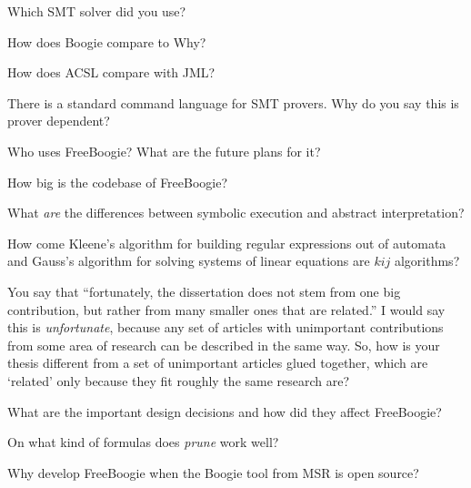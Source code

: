 \Q Which SMT solver did you use?

\Q How does Boogie compare to Why?

\Q How does ACSL compare with JML?

\Q There is a standard command language for SMT provers. Why do you say
this is prover dependent?

\Q Who uses FreeBoogie? What are the future plans for it?

\Q How big is the codebase of FreeBoogie?

\Q What {\it are\/} the differences between symbolic execution and abstract
interpretation?

\Q How come Kleene's algorithm for building regular expressions out of
automata and Gauss's algorithm for solving systems of linear equations are
$kij$ algorithms?

\Q You say that ``fortunately, the dissertation does not stem from one big
contribution, but rather from many smaller ones that are related.'' I would
say this is {\it unfortunate}, because any set of articles with unimportant
contributions from some area of research can be described in the same way.
So, how is your thesis different from a set of unimportant articles glued
together, which are `related' only because they fit roughly the same
research are?

\Q What are the important design decisions and how did they affect
FreeBoogie?

\Q On what kind of formulas does {\it prune\/} work well?

\Q Why develop FreeBoogie when the Boogie tool from MSR is open source?

\bye

